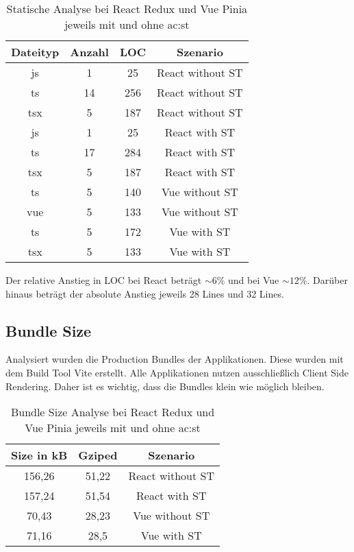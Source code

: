 \begin{table}[h!]
  \caption{Statische Analyse bei React Redux und Vue Pinia jeweils mit und ohne \acrshort{ac:st}}
  \label{tab:staticAnalysisSTvsNoST}

  \begin{center}
    \begin{tabular}{|c|c|c|c|} 
    \hline
    Dateityp & Anzahl & LOC & Szenario \\ [0.5ex] 
    \hline\hline
    js & 1 & 25 & React without ST \\ 
    \hline
    ts & 14 & 256 & React without ST \\
    \hline
    tsx & 5 & 187 & React without ST \\
    \hline\hline
    js & 1 & 25 & React with ST \\ 
    \hline
    ts & 17 & 284 & React with ST \\
    \hline
    tsx & 5 & 187 & React with ST \\
    \hline\hline
    ts & 5 & 140 & Vue without ST \\
    \hline
    vue & 5 & 133 & Vue without ST \\
    \hline\hline
    ts & 5 & 172 & Vue with ST \\
    \hline
    tsx & 5 & 133 & Vue with ST \\
    \hline
    \end{tabular}
  \end{center}
\end{table}

Der relative Anstieg in LOC bei React beträgt $\sim6\%$ und bei Vue $\sim12\%$. Darüber hinaus beträgt der absolute Anstieg jeweils 28 Lines und 32 Lines.

\subsection{Bundle Size}

Analysiert wurden die Production Bundles der Applikationen. Diese wurden mit dem Build Tool Vite erstellt. Alle Applikationen nutzen ausschließlich Client Side Rendering. Daher ist es wichtig, dass die Bundles klein wie möglich bleiben.

\begin{table}[h!]
  \caption{Bundle Size Analyse bei React Redux und Vue Pinia jeweils mit und ohne \acrshort{ac:st}}
  \label{tab:bundSizeAnalysisSTvsNoST}

  \begin{center}
    \begin{tabular}{|c|c|c|} 
    \hline
    Size in kB & Gziped & Szenario \\ [0.5ex]
    \hline\hline
    156,26 & 51,22 & React without ST \\
    \hline
    157,24 & 51,54 & React with ST \\
    \hline
    70,43 & 28,23 & Vue without ST \\
    \hline
    71,16 & 28,5 & Vue with ST \\
    \hline
    \end{tabular}
  \end{center}
\end{table}

